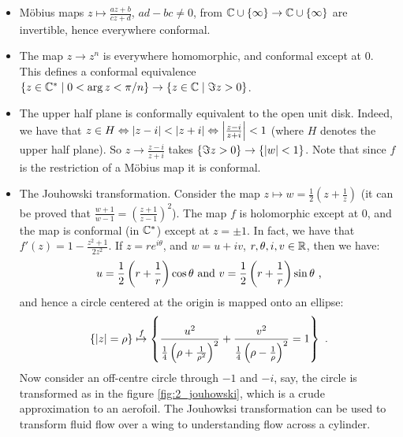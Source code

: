\begin{itemize}
\item Möbius maps $z \mapsto \frac{az+b}{cz+d}$, $ad - bc \neq 0$, from $\CC \cup \{ \infty \} \rightarrow \CC \cup \{ \infty \}$ are invertible, hence everywhere conformal.
\item The map $z \rightarrow z^n$ is everywhere homomorphic, and conformal except at $0$. This defines a conformal equivalence $\{ z \in \CC^* \mid 0 < \arg z < \pi/n \} \rightarrow \{ z \in \CC \mid \Im z > 0 \}$.
\item The upper half plane is conformally equivalent to the open unit disk. Indeed, we have that $z \in H \Leftrightarrow \abs{z - i} < \abs{z + i} \Leftrightarrow \abs*{\frac{z-i}{z+i}} < 1$ (where $H$ denotes the upper half plane). So $z \rightarrow \frac{z-i}{z+i}$ takes $\{ \Im z > 0 \} \rightarrow \{ \abs{w} < 1 \}$. Note that since $f$ is the restriction of a Möbius map it is conformal.
\item The Jouhowski transformation. Consider the map $z \mapsto w = \frac{1}{2}\left(z + \frac{1}{z}\right)$ (it can be proved that $\frac{w + 1}{w - 1} = \left(\frac{z + 1}{z - 1}\right)^2$). 
The map $f$ is holomorphic except at $0$, and the map is conformal (in $\CC^*$) except at $z = \pm 1$. 
In fact, we have that $f'(z) = 1 - \frac{z^2 + 1}{2z^2}$. If $z = re^{i\theta}$, and $w = u + iv$, $r, \theta, i, v \in \RR$, then we have:
\[
u = \frac{1}{2}\left(r + \frac{1}{r}\right)\cos \theta \text{ and } v = \frac{1}{2}\left(r + \frac{1}{r}\right)\sin \theta \mpunct{,}
\]
and hence a circle centered at the origin is mapped onto an ellipse:
\[
\{ \abs{z} = \rho \} \stackrel{f}{\mapsto} \left\{ \frac{u^2}{\frac{1}{4}\left(\rho + \frac{1}{\rho^2}\right)^2} + \frac{v^2}{\frac{1}{4}\left(\rho - \frac{1}{\rho}\right)^2} = 1 \right\} \mpunct{.}
\]
Now consider an off-centre circle through $-1$ and $-i$, say, the circle is transformed as in the figure \ref{fig:2_jouhowski}, which is a crude approximation to an aerofoil. The Jouhowksi transformation can be used to transform fluid flow over a wing to understanding flow across a cylinder.
\end{itemize}

